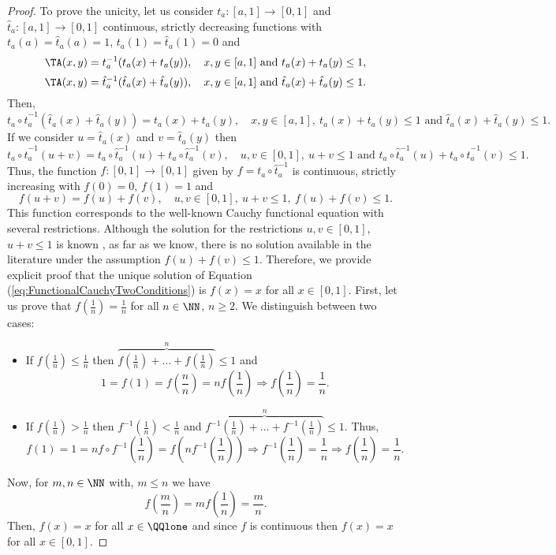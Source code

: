 \begin{proof}
	To prove the unicity, let us consider $t_a:[a,1] \to [0,1]$ and $\hat{t}_a:[a,1] \to [0,1]$ continuous, strictly decreasing functions with $t_a(a)=\hat{t}_a(a)=1$, $t_a(1)=\hat{t}_a(1)=0$ and
	$$\TA(x,y)=t_a^{-1}(t_a(x)+t_a(y)), \quad x,y \in [a,1] \text{ and } t_a(x)+t_a(y) \leq 1,$$
	$$\TA(x,y)=\hat{t}_a^{-1}(\hat{t}_a(x)+\hat{t}_a(y)), \quad x,y \in [a,1] \text{ and } \hat{t}_a(x)+\hat{t}_a(y) \leq 1.$$
	Then,
	$$t_a \circ \hat{t}_a^{-1}(\hat{t}_a(x)+\hat{t}_a(y))=t_a(x)+t_a(y), \quad x,y \in [a,1],~ t_a(x)+t_a(y) \leq 1 \text{ and } \hat{t}_a(x)+\hat{t}_a(y) \leq 1.$$
	If we consider $u = \hat{t}_a(x)$ and $v=\hat{t}_a(y)$ then
	$$t_a \circ \hat{t}_a^{-1}(u+v)=t_a\circ \hat{t}_a^{-1}(u)+t_a\circ \hat{t}_a^{-1}(v), \quad u,v \in [0,1],~ u+v \leq 1 \text{ and }t_a \circ \hat{t}_a ^{-1}(u)+t_a \circ \hat{t}_a ^{-1}(v) \leq 1.$$
	Thus, the function $f:[0,1] \to [0,1]$ given by $f= t_a \circ \hat{t}_a ^{-1}$ is continuous, strictly increasing with $f(0)=0$, $f(1)=1$ and
	\begin{equation}\label{eq:FunctionalCauchyTwoConditions}
		f(u+v)=f(u)+f(v), \quad u,v \in [0,1],~ u+v \leq 1,~ f(u)+f(v) \leq 1.
	\end{equation}
	This function corresponds to the well-known Cauchy functional equation with several restrictions. Although the solution for the restrictions $u,v \in [0,1]$, $u+v \leq 1$ is known \cite{Aczel1966}, as far as we know, there is no solution available in the literature under the assumption $f(u)+f(v) \leq 1$. Therefore, we provide explicit proof that the unique solution of Equation (\ref{eq:FunctionalCauchyTwoConditions}) is $f(x)=x$ for all $x \in [0,1]$. First, let us prove that $f\left(\frac{1}{n}\right)= \frac{1}{n}$ for all $n \in \NN$, $n \geq 2$. We distinguish between two cases:
	\begin{itemize}
		\item If $f\left(\frac{1}{n}\right) \leq \frac{1}{n}$ then $\overbrace{f\left(\frac{1}{n}\right) + \dots + f\left(\frac{1}{n}\right)}^n \leq 1$ and
		$$1=f(1)=f\left(\frac{n}{n}\right) = nf\left(\frac{1}{n}\right) \Rightarrow f\left(\frac{1}{n}\right) = \frac{1}{n}.$$
		\item If $f\left(\frac{1}{n}\right) > \frac{1}{n}$ then $f^{-1} \left(\frac{1}{n}\right)<\frac{1}{n}$ and $\overbrace{f^{-1}\left(\frac{1}{n}\right) + \dots + f^{-1}\left(\frac{1}{n}\right)}^n \leq 1$. Thus,
		$$f(1)=1 = n f \circ f^{-1} \left(\frac{1}{n}\right) = f \left(n f^{-1}\left(\frac{1}{n}\right)\right) \Rightarrow f^{-1}\left(\frac{1}{n}\right) = \frac{1}{n} \Rightarrow f \left(\frac{1}{n}\right) = \frac{1}{n}.$$
	\end{itemize}	
	\noindent Now, for $m,n \in \NN$ with, $m\leq n$ we have
	$$f \left(\frac{m}{n}\right) =m f\left(\frac{1}{n}\right) = \frac{m}{n}.$$
	Then, $f(x)=x$ for all $x \in \QQlone$ and since $f$ is continuous then $f(x)=x$ for all $x \in [0,1]$.
\end{proof}

